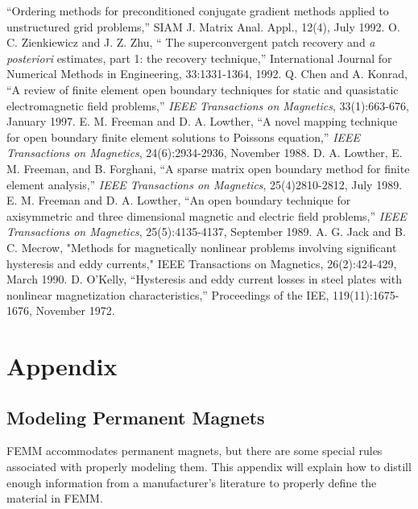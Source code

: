 \documentclass[12pt]{report}
\begin{document}
\begin{thebibliography}{99}
``Ordering methods for preconditioned conjugate gradient methods
applied to unstructured grid problems,'' SIAM J. Matrix Anal.
Appl., 12(4), July 1992.
 O. C. Zienkiewicz and J. Z. Zhu, `` The
superconvergent patch recovery and {\em a posteriori} estimates,
part 1:  the recovery technique,'' International Journal for
Numerical Methods in Engineering, 33:1331-1364, 1992.
 Q. Chen and A. Konrad, ``A review of finite element
open boundary techniques for static and quasistatic electromagnetic
field problems,'' {\em IEEE Transactions on Magnetics},
33(1):663-676, January 1997.
 E. M. Freeman and D. A. Lowther, ``A novel
mapping technique for open boundary finite element solutions to
Poissons equation,'' {\em IEEE Transactions on Magnetics},
24(6):2934-2936, November 1988.
 D. A. Lowther, E. M. Freeman, and B.
Forghani, ``A sparse matrix open boundary method for finite element
analysis,'' {\em IEEE Transactions on Magnetics}, 25(4)2810-2812,
July 1989.
 E. M. Freeman and D. A. Lowther, ``An open
boundary technique for axisymmetric and three dimensional magnetic
and electric field problems,'' {\em IEEE Transactions on
Magnetics}, 25(5):4135-4137, September 1989.
 A. G. Jack and B. C. Mecrow, "Methods for magnetically nonlinear
problems involving significant hysteresis and eddy currents," IEEE
Transactions on Magnetics, 26(2):424-429, March 1990.
 D. O'Kelly, ``Hysteresis and eddy current losses in
steel plates with nonlinear magnetization characteristics,''
Proceedings of the IEE, 119(11):1675-1676, November 1972.
\end{thebibliography}
\newpage
\appendix
\chapter{Appendix}

\section{Modeling Permanent Magnets} \label{app_pm}

FEMM accommodates permanent magnets, but there are some special
rules associated with properly modeling them.  This appendix will
explain how to distill enough information from a manufacturer's
literature to properly define the material in FEMM.
\end{document}
